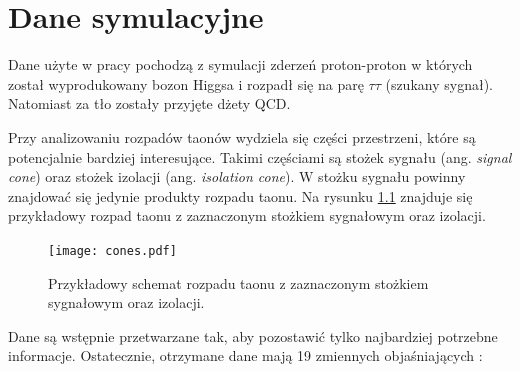 \documentclass{pracalicmgr}
\begin{document}
    \chapter{Dane symulacyjne}
    \label{ch:dane}
    Dane użyte w pracy pochodzą z symulacji zderzeń proton-proton w których został wyprodukowany bozon Higgsa i rozpadł się na parę $\tau\tau$ (szukany sygnał). Natomiast za tło zostały przyjęte dżety QCD.
	
	Przy analizowaniu rozpadów taonów wydziela się części przestrzeni, które są potencjalnie bardziej interesujące. Takimi częściami są stożek sygnału (ang. \textit{signal cone}) oraz stożek izolacji (ang. \textit{isolation cone}). W stożku sygnału powinny znajdować się jedynie produkty rozpadu taonu. Na rysunku \ref{fig:cones} znajduje się przykładowy rozpad taonu z zaznaczonym stożkiem sygnałowym oraz izolacji.

	\begin{figure}[H]
	\centering
	\texttt{[image: cones.pdf]}
	\caption{Przykładowy schemat rozpadu taonu z zaznaczonym stożkiem sygnałowym oraz izolacji.}
	\label{fig:cones}
	\end{figure}

\newpage    
Dane są wstępnie przetwarzane tak, aby pozostawić tylko najbardziej potrzebne informacje. Ostatecznie, otrzymane dane mają 19 zmiennych objaśniających \cite{cms2016reconstruction}:
\end{document}
